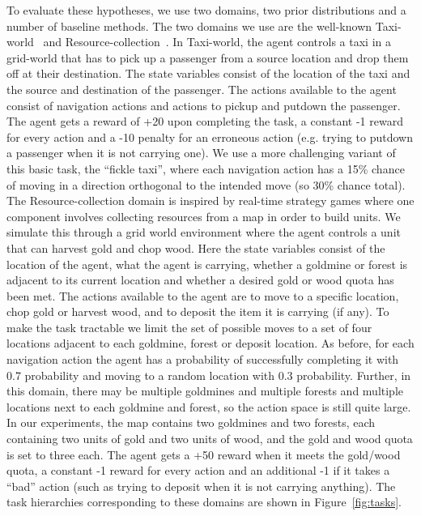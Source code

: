 To evaluate these hypotheses, we use two domains, two prior
distributions and a number of baseline methods. The two domains we use
are the well-known {\sf Taxi-world}~\cite{d-hrl-00} and {\sf
  Resource-collection}~\cite{mehta.icml08}. In {\sf Taxi-world}, the agent
controls a taxi in a grid-world that has to pick up a passenger from a
source location and drop them off at their destination. The state
variables consist of the location of the taxi and the source and
destination of the passenger. The actions available to the agent
consist of navigation actions and actions to pickup and putdown the
passenger.  The agent gets a reward of +20 upon completing the task, a
constant -1 reward for every action and a -10 penalty for an erroneous
action (e.g. trying to putdown a passenger when it is not carrying
one). We use a more challenging variant of this basic task, the
``fickle taxi'', where each navigation action has a 15\% chance of
moving in a direction orthogonal to the intended move (so 30\% chance
total). The {\sf Resource-collection} domain is inspired by real-time
strategy games where one component involves collecting resources from
a map in order to build units. We simulate this through a grid world
environment where the agent controls a unit that can harvest gold and
chop wood. Here the state variables consist of the location of the
agent, what the agent is carrying, whether a goldmine or forest is
adjacent to its current location and whether a desired gold or wood
quota has been met. The actions available to the agent are to move
to a specific location, chop gold or harvest wood, and to deposit the item it is
carrying (if any). To make the task tractable we limit the set of
possible moves to a set of four locations adjacent to each goldmine, forest
or deposit location. As before, for each navigation action the agent has
a probability of successfully completing it with 0.7 probability and
moving to a random location with 0.3 probability. Further, in this
domain, there may be multiple goldmines and multiple forests and
multiple locations next to each goldmine and forest, so the action
space is still quite large. In our experiments, the map contains two
goldmines and two forests, each containing two units of gold and two
units of wood, and the gold and wood quota is set to three each. The
agent gets a +50 reward when it meets the gold/wood quota, a constant -1
reward for every action and an additional -1 if it takes a ``bad''
action (such as trying to deposit when it is not carrying anything).
The task hierarchies corresponding to these domains are shown in
Figure~\ref{fig:tasks}.

